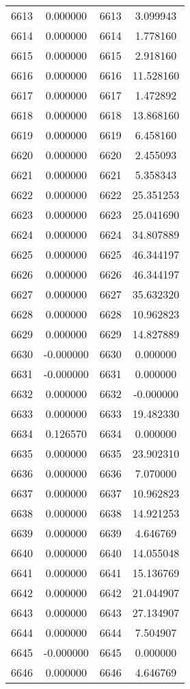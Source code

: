 \documentclass[12pt]{article}
\begin{document}
\begin{longtable}{@{}cccc@{}}
6613 & 0.000000 & 6613 & 3.099943 \\
6614 & 0.000000 & 6614 & 1.778160 \\
6615 & 0.000000 & 6615 & 2.918160 \\
6616 & 0.000000 & 6616 & 11.528160 \\
6617 & 0.000000 & 6617 & 1.472892 \\
6618 & 0.000000 & 6618 & 13.868160 \\
6619 & 0.000000 & 6619 & 6.458160 \\
6620 & 0.000000 & 6620 & 2.455093 \\
6621 & 0.000000 & 6621 & 5.358343 \\
6622 & 0.000000 & 6622 & 25.351253 \\
6623 & 0.000000 & 6623 & 25.041690 \\
6624 & 0.000000 & 6624 & 34.807889 \\
6625 & 0.000000 & 6625 & 46.344197 \\
6626 & 0.000000 & 6626 & 46.344197 \\
6627 & 0.000000 & 6627 & 35.632320 \\
6628 & 0.000000 & 6628 & 10.962823 \\
6629 & 0.000000 & 6629 & 14.827889 \\
6630 & -0.000000 & 6630 & 0.000000 \\
6631 & -0.000000 & 6631 & 0.000000 \\
6632 & 0.000000 & 6632 & -0.000000 \\
6633 & 0.000000 & 6633 & 19.482330 \\
6634 & 0.126570 & 6634 & 0.000000 \\
6635 & 0.000000 & 6635 & 23.902310 \\
6636 & 0.000000 & 6636 & 7.070000 \\
6637 & 0.000000 & 6637 & 10.962823 \\
6638 & 0.000000 & 6638 & 14.921253 \\
6639 & 0.000000 & 6639 & 4.646769 \\
6640 & 0.000000 & 6640 & 14.055048 \\
6641 & 0.000000 & 6641 & 15.136769 \\
6642 & 0.000000 & 6642 & 21.044907 \\
6643 & 0.000000 & 6643 & 27.134907 \\
6644 & 0.000000 & 6644 & 7.504907 \\
6645 & -0.000000 & 6645 & 0.000000 \\
6646 & 0.000000 & 6646 & 4.646769 \\

\end{longtable}
\end{document}
